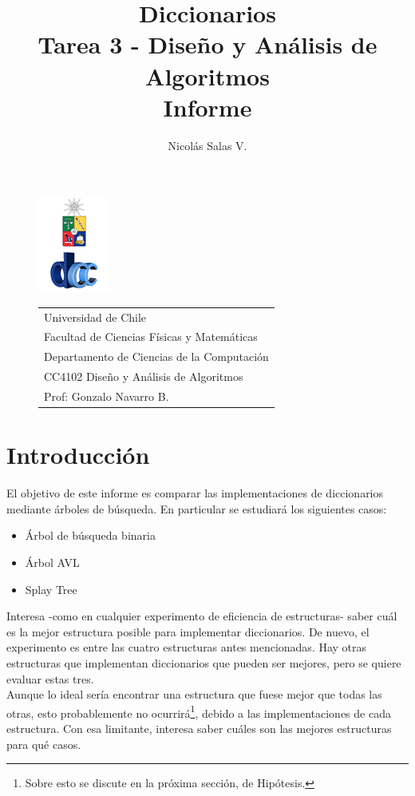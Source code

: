 \documentclass[12pt,letterpaper]{report}
\title{\Huge Diccionarios \\ Tarea 3 - Diseño y Análisis de Algoritmos \\ Informe}
\author{Nicolás Salas V.}
\begin{document}
\begin{figure}[t]
\includegraphics[scale=0.83]{logo.png}
\begin{tabular}{l}
\small Universidad de Chile\\
\small Facultad de Ciencias Físicas y Matemáticas\\
\small Departamento de Ciencias de la Computación\\
\small CC4102 Diseño y Análisis de Algoritmos\\
\small Prof: Gonzalo Navarro B.
\vspace{2.3cm}
\end{tabular}
\end{figure}

\maketitle

\tableofcontents
\newpage

\section{Introducción}
El objetivo de este informe es comparar las implementaciones de diccionarios mediante \'arboles de b\'usqueda. En particular se estudiar\'a los siguientes casos:

\begin{itemize}
\item \'Arbol de b\'usqueda binaria
\item \'Arbol AVL
\item Splay Tree
\end{itemize}

Interesa -como en cualquier experimento de eficiencia de estructuras- saber cu\'al es la mejor estructura posible para implementar diccionarios. De nuevo, el experimento es entre las cuatro estructuras antes mencionadas. Hay otras estructuras que implementan diccionarios que pueden ser mejores, pero se quiere evaluar estas tres.\\

Aunque lo ideal sería encontrar una estructura que fuese mejor que todas las otras, esto probablemente no ocurrirá\footnote{Sobre esto se discute en la próxima sección, de Hipótesis.}, debido a las implementaciones de cada estructura. Con esa limitante, interesa saber cuáles son las mejores estructuras para qué casos.\\
\end{document}
